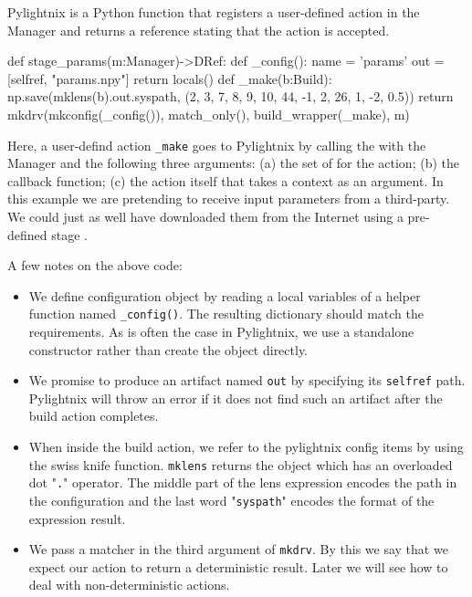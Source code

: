Pylightnix  is a Python function that
registers a user-defined action in the Manager and returns a
 reference stating that the action is
accepted.

\begin{pythontexcode}
def stage_params(m:Manager)->DRef:
  def _config():
    name = 'params'
    out = [selfref, "params.npy"]
    return locals()
  def _make(b:Build):
    np.save(mklens(b).out.syspath, (2, 3, 7, 8, 9, 10, 44, -1, 2, 26, 1, -2, 0.5))
  return mkdrv(mkconfig(_config()), match_only(), build_wrapper(_make), m)
\end{pythontexcode}

Here, a user-defind action \texttt{\_make} goes to Pylightnix by calling the
 with the Manager and the following three
arguments: (a) the set of  for the
action; (b) the  callback function; (c)
the action itself that takes a  context as
an argument. In this example we are pretending to receive input parameters from
a third-party. We could just as well have downloaded them from the Internet using
a pre-defined stage .

\hfill \break \noindent
A few notes on the above code:

\begin{itemize}
  \item We define configuration object by reading a local variables of a helper
    function named \texttt{\_config()}. The resulting dictionary should match
    the  requirements. As is often the
    case in Pylightnix, we use a standalone
     constructor rather than create the
    object directly.
  \item We promise to produce an artifact named \texttt{out} by specifying its
    \texttt{selfref} path. Pylightnix will throw an error if it does not find
    such an artifact after the build action completes.
  \item When inside the build action, we refer to the pylightnix config items by
    using the  swiss knife function.
    \texttt{mklens} returns the  object which
    has an overloaded dot "\texttt{.}" operator. The middle part of the lens
    expression encodes the path in the configuration and the last word
    "\texttt{syspath}" encodes the format of the expression result.
  \item We pass a  matcher in
    the third argument of \texttt{mkdrv}. By this we say that we expect our
    action to return a deterministic result. Later we will see how to deal with
    non-deterministic actions.
  \end{itemize}

